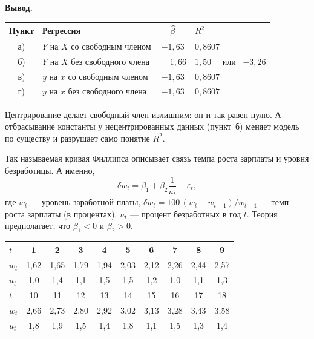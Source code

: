 \begin{solution}
\medskip
\textbf{Вывод.}
\begin{center}
\begin{tabular}{clcl}
\toprule
Пункт & Регрессия & $\widehat{\beta}$ & $R^2$ \\
\midrule
а) & $Y$ на $X$ со свободным членом  & $-1{,}63$ & $0{,}8607$ \\
б) & $Y$ на $X$ без свободного члена & $\phantom{-}1{,}66$ & $1{,}50$ \ \ или \ $-3{,}26$ \\
в) & $y$ на $x$ со свободным членом  & $-1{,}63$ & $0{,}8607$ \\
г) & $y$ на $x$ без свободного члена & $-1{,}63$ & $0{,}8607$ \\
\bottomrule
\end{tabular}
\end{center}
Центрирование делает свободный член излишним: он и так равен нулю. А отбрасывание
константы у нецентрированных данных (пункт~б) меняет модель по существу и
разрушает само понятие $R^2$.
\end{solution}


Так называемая кривая Филлипса описывает связь темпа роста зарплаты и уровня
безработицы. А именно,
\[
  \delta w_t = \beta_1 + \beta_2 \frac{1}{u_t} + \varepsilon_t,
\]
где $w_t$ --- уровень заработной платы,
$\delta w_t = 100\,(w_t - w_{t-1})/w_{t-1}$ --- темп роста зарплаты (в процентах),
$u_t$ --- процент безработных в год $t$. Теория предполагает, что
$\beta_1 < 0$ и $\beta_2 > 0$.

\begin{center}
\small
\begin{tabular}{l *{9}{c}}
\toprule
$t$   & 1 & 2 & 3 & 4 & 5 & 6 & 7 & 8 & 9 \\
\midrule
$w_t$ & 1,62 & 1,65 & 1,79 & 1,94 & 2,03 & 2,12 & 2,26 & 2,44 & 2,57 \\
$u_t$ & 1,0 & 1,4 & 1,1 & 1,5 & 1,5 & 1,2 & 1,0 & 1,1 & 1,3 \\
\midrule
$t$   & 10 & 11 & 12 & 13 & 14 & 15 & 16 & 17 & 18 \\
\midrule
$w_t$ & 2,66 & 2,73 & 2,80 & 2,92 & 3,02 & 3,13 & 3,28 & 3,43 & 3,58 \\
$u_t$ & 1,8 & 1,9 & 1,5 & 1,4 & 1,8 & 1,1 & 1,5 & 1,3 & 1,4 \\
\bottomrule
\end{tabular}
\end{center}

